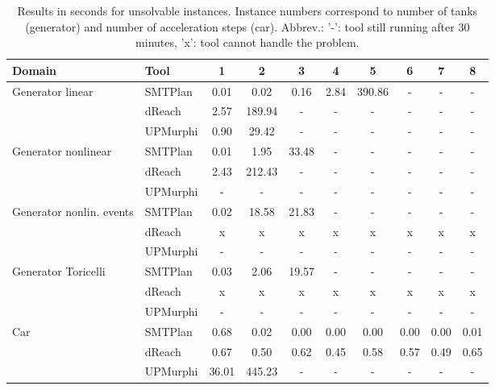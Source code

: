 \begin{table}[ht]
\centering
\def\arraystretch{1.2}
\begin{tabular}{|l|l|cccccccc|}
\hline
Domain         & Tool      & 1    & 2      & 3     & 4    & 5      & 6    & 7    & 8     \\
\hline
\multirow{3}{*}{\parbox{6em}{Generator linear}}
               & SMTPlan & 0.01 & 0.02   & 0.16  & 2.84 & 390.86  & -    & -    & -     \\
               & dReach    & 2.57 & 189.94 & -     & -    & -      & -    & -    & -     \\
               & UPMurphi  & 0.90 & 29.42  & -     & -    & -      & -    & -    & -     \\ %
\hline \hline
\multirow{3}{*}{\parbox{6em}{Generator nonlinear}}
               & SMTPlan  & 0.01 & 1.95   & 33.48 & -    & -      & -    & -    & -     \\
               & dReach    & 2.43 & 212.43 & -     & -    & -      & -    & -    & -     \\
               & UPMurphi  & -    & -      & -     & -    & -      & -    & -    & -     \\
\hline \hline
\multirow{3}{*}{\parbox{6em}{Generator nonlin. events}}
               & SMTPlan  & 0.02   & 18.58   & 21.83 & -    & -      & -    & -    & -     \\
               & dReach    & x      & x       & x     & x    & x      & x    & x    & x     \\
               & UPMurphi  & -      & -       & -     & -    & -      & -    & -    & -     \\
\hline \hline
\multirow{3}{*}{\parbox{6em}{Generator Toricelli}}
               & SMTPlan  & 0.03  & 2.06   & 19.57 & -    & -      & -    & -    & -     \\
               & dReach    & x     & x      & x     & x    & x      & x    & x    & x     \\
               & UPMurphi  & -     & -      & -     & -    & -      & -    & -    & -     \\
\hline \hline
\multirow{3}{*}{\parbox{6em}{Car}}
               & SMTPlan  & 0.68  & 0.02   & 0.00  & 0.00 & 0.00   & 0.00 & 0.00 & 0.01  \\
               & dReach    & 0.67  & 0.50   & 0.62  & 0.45 & 0.58   & 0.57 & 0.49 & 0.65  \\
               & UPMurphi  & 36.01 & 445.23 & -     & -    & -      & -    & -    & -     \\ %
\hline
\end{tabular}
\caption{Results in seconds for unsolvable instances. Instance numbers correspond to number of tanks (generator) and number of acceleration steps (car). Abbrev.: ’-’: tool still running after 30 minutes, ’x’: tool cannot handle the problem.}
\label{tab:unsolvable}
\end{table}


